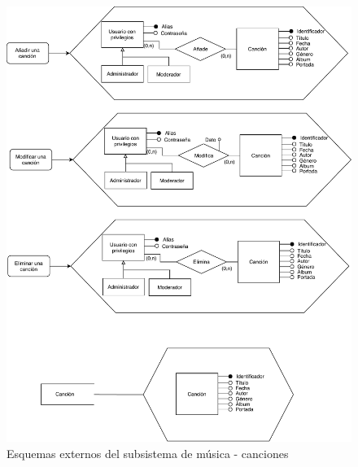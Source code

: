 \begin{figure}[H]
  \caption{Esquemas externos del subsistema de música - canciones}
  \centering
  \includegraphics[scale=0.7]{diagramas/musica-externo-cancion.pdf}
\end{figure}

